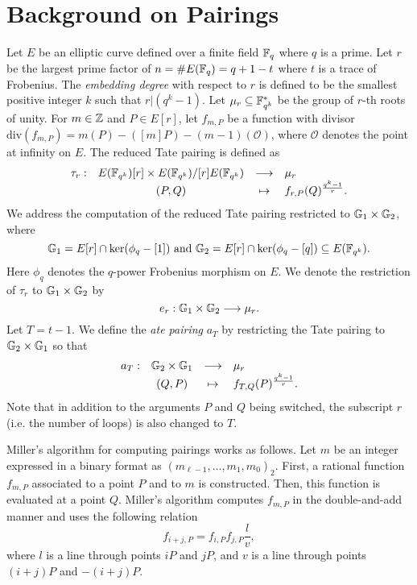 \section{Background on Pairings}
\label{sec:background}

Let $E$ be an elliptic curve defined over a finite field $\mathbb{F}_{q}$ where $q$ is a prime.
Let $r$ be the largest prime factor of $n = \#E(\mathbb{F}_{q}) = q + 1 - t$ where $t$ is a trace of Frobenius.
The \emph{embedding degree} with respect to $r$ is defined to be the smallest positive integer $k$ such that $r | (q^k-1)$.
Let $\mu_{r} \subseteq \mathbb{F}_{q^{k}}^{*}$ be the group of $r$-th roots of unity.
For $m \in \mathbb{Z}$ and $P \in E[r]$,
let $f_{m,P}$ be a function with divisor 
$\text{div}(f_{m,P}) = m(P) - ([m]P) - (m-1)(\mathcal{O})$,
where $\mathcal{O}$ denotes the point at infinity on $E$.
The reduced Tate pairing is defined as
\[\begin{array}{rccl}
\tau_{r} :	& E(\mathbb{F}_{q^{k}})[r] \times E(\mathbb{F}_{q^{k}})/[r]E(\mathbb{F}_{q^{k}})	& \longrightarrow	& \mu_{r} \\
		& (P,Q)								& \mapsto		& f_{r,P}(Q)^{\frac{q^{k}-1}{r}}.
\end{array}\]
We address the computation of the reduced Tate pairing restricted to $\mathbb{G}_{1} \times \mathbb{G}_{2}$, where
$$\mathbb{G}_{1} = E[r] \cap \ker(\phi_{q}-[1]) \text{ and }
\mathbb{G}_{2} = E[r] \cap \ker(\phi_{q} - [q]) \subseteq E(\mathbb{F}_{q^{k}}).$$
Here $\phi_{q}$ denotes the $q$-power Frobenius morphism on $E$.
We denote the restriction of $\tau_{r}$ to $\mathbb{G}_{1} \times \mathbb{G}_{2}$ by
$$e_{r} : \mathbb{G}_{1} \times \mathbb{G}_{2} \longrightarrow \mu_{r}.$$
Let $T = t-1$.
We define the \emph{ate pairing} $a_{T}$ by restricting the Tate pairing to $\mathbb{G}_{2} \times \mathbb{G}_{1}$ so that
\[\begin{array}{rccl}
a_{T} :	& \mathbb{G}_{2} \times \mathbb{G}_{1}	& \longrightarrow	& \mu_{r} \\
	& (Q,P) 		& \mapsto		& f_{T,Q}(P)^{\frac{q^{k}-1}{r}}.
\end{array}\]
Note that in addition to the arguments $P$ and $Q$ being switched, the subscript $r$ (i.e. the number of loops) is also changed to $T$.

Miller's algorithm for computing pairings works as follows.
Let $m$ be an integer expressed in a binary format as $(m_{\ell-1},\dots,m_1,m_0)_2$.
First, a rational function $f_{m,P}$ associated to a point $P$ and to $m$ is constructed.
Then, this function is evaluated at a point $Q$.
Miller's algorithm computes $f_{m,P}$ in the double-and-add manner
and uses the following relation
$$ f_{i+j,P} = f_{i,P} f_{j,P} \frac{l}{v}, $$
where $l$ is a line through points $iP$ and $jP$,
and $v$ is a line through points $(i+j)P$ and $-(i+j)P$.

